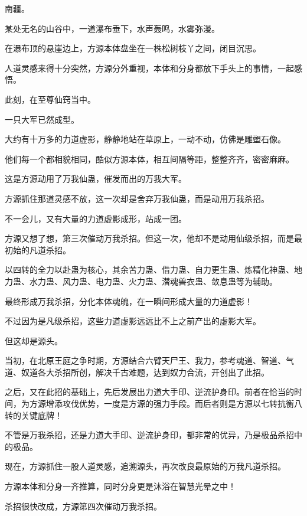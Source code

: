 
\begin{this_body}

南疆。

某处无名的山谷中，一道瀑布垂下，水声轰鸣，水雾弥漫。

在瀑布顶的悬崖边上，方源本体盘坐在一株松树枝丫之间，闭目沉思。

人道灵感来得十分突然，方源分外重视，本体和分身都放下手头上的事情，一起感悟。

此刻，在至尊仙窍当中。

一只大军已然成型。

大约有十万多的力道虚影，静静地站在草原上，一动不动，仿佛是雕塑石像。

他们每一个都相貌相同，酷似方源本体，相互间隔等距，整整齐齐，密密麻麻。

这是方源动用了万我仙蛊，催发而出的万我大军。

方源抓住那道灵感不放，这一次却是舍弃万我仙蛊，而是动用万我杀招。

不一会儿，又有大量的力道虚影成形，站成一团。

方源又想了想，第三次催动万我杀招。但这一次，他却不是动用仙级杀招，而是最初始的凡道杀招。

以四转的全力以赴蛊为核心，其余苦力蛊、借力蛊、自力更生蛊、炼精化神蛊、地力蛊、水力蛊、风力蛊、电力蛊、火力蛊、潜魂兽衣蛊、敛息蛊等为辅助。

最终形成万我杀招，分化本体魂魄，在一瞬间形成大量的力道虚影！

不过因为是凡级杀招，这些力道虚影远远比不上之前产出的虚影大军。

但这却是源头。

当初，在北原王庭之争时期，方源结合六臂天尸王、我力，参考魂道、智道、气道、奴道各大杀招所创，解决千古难题，达到奴力合流，开创出了此招。

之后，又在此招的基础上，先后发展出力道大手印、逆流护身印。前者在恰当的时间，为方源增添攻伐优势，一度是方源的强力手段。而后者则是方源以七转抗衡八转的关键底牌！

不管是万我杀招，还是力道大手印、逆流护身印，都非常的优异，乃是极品杀招中的极品。

现在，方源抓住一股人道灵感，追溯源头，再次改良最原始的万我凡道杀招。

方源本体和分身一齐推算，同时分身更是沐浴在智慧光晕之中！

杀招很快改成，方源第四次催动万我杀招。


\end{this_body}
